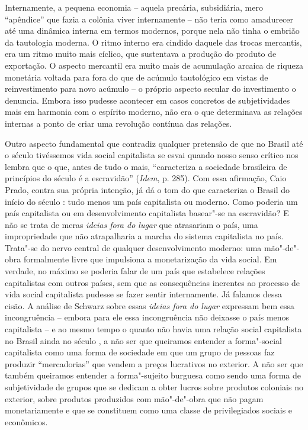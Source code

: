 Internamente, a pequena economia -- aquela precária, subsidiária, mero
``apêndice'' que fazia a colônia viver internamente -- não teria como
amadurecer até uma dinâmica interna em termos modernos, porque nela não
tinha o embrião da tautologia moderna. O ritmo interno era cindido
daquele das trocas mercantis, era um ritmo muito mais cíclico, que
sustentava a produção do produto de exportação. O aspecto mercantil era
muito mais de acumulação arcaica de riqueza monetária voltada para fora
do que de acúmulo tautológico em vistas de reinvestimento para novo
acúmulo -- o próprio aspecto secular do investimento o denuncia. Embora
isso pudesse acontecer em casos concretos de subjetividades mais em
harmonia com o espírito moderno, não era o que determinava as relações
internas a ponto de criar uma revolução contínua das relações.

Outro aspecto fundamental que contradiz qualquer pretensão de que no
Brasil até o século  tivéssemos vida social capitalista se esvai
quando nosso senso crítico nos lembra que o que, antes de tudo o mais,
``caracteriza a sociedade brasileira de princípios do século  é a
escravidão'' (\emph{Idem}, p. 285). Com essa afirmação, Caio Prado,
contra sua própria intenção, já dá o tom do que caracteriza o Brasil do
início do século : tudo menos um país capitalista ou moderno. Como
poderia um país capitalista ou em desenvolvimento capitalista basear"-se
na escravidão? E não se trata de meras \emph{ideias fora do lugar} que
atrasariam o país, uma impropriedade que não atrapalharia a marcha do
sistema capitalista no país. Trata"-se do nervo central de qualquer
desenvolvimento moderno: uma mão"-de"-obra formalmente livre que
impulsiona a monetarização da vida social. Em verdade, no máximo se
poderia falar de um país que estabelece relações capitalistas com outros
países, sem que as consequências inerentes ao processo de vida social
capitalista pudesse se fazer sentir internamente. Já falamos dessa
cisão. A análise de Schwarz sobre essas \emph{ideias fora do lugar}
expressam bem essa incongruência -- embora para ele essa incongruência
não deixasse o país menos capitalista -- e ao mesmo tempo o quanto não
havia uma relação social capitalista no Brasil ainda no século , a
não ser que queiramos entender a forma"-social capitalista como uma forma
de sociedade em que um grupo de pessoas faz produzir ``mercadorias'' que
vendem a preços lucrativos no exterior. A não ser que também queiramos
entender a forma"-sujeito burguesa como sendo uma forma de subjetividade
de grupos que se dedicam a obter lucros sobre produtos coloniais no
exterior, sobre produtos produzidos com mão"-de"-obra que não pagam
monetariamente e que se constituem como uma classe de privilegiados
sociais e econômicos.

